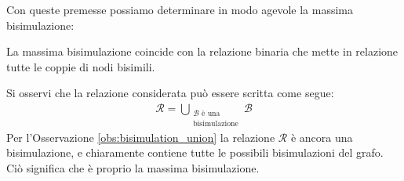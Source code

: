 Con queste premesse possiamo determinare in modo agevole la massima bisimulazione:
\begin{theorem}
    La massima bisimulazione coincide con la relazione binaria che mette in relazione tutte le coppie di nodi bisimili.
\end{theorem}
\begin{proof2}
    Si osservi che la relazione considerata può essere scritta come segue:
    \begin{gather*}
        \mathcal{R} =  \bigcup_{\substack{\mathcal{B} \text{ è una}\\\text{bisimulazione}}} \mathcal{B}
    \end{gather*}
    Per l'Osservazione \ref{obs:bisimulation_union} la relazione $\mathcal{R}$ è ancora una bisimulazione, e chiaramente contiene tutte le possibili bisimulazioni del grafo. Ciò significa che è proprio la massima bisimulazione.
\end{proof2}

